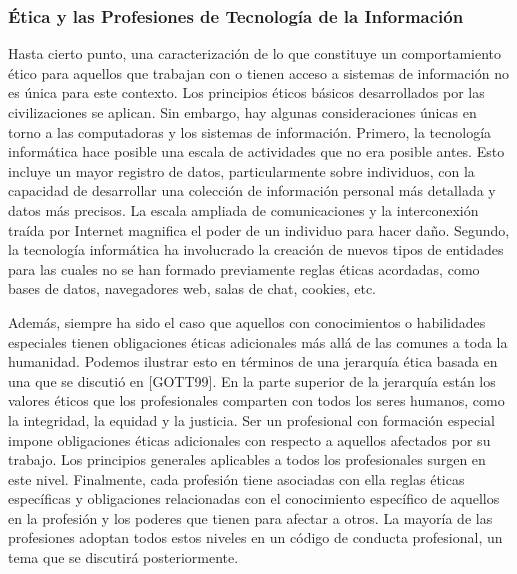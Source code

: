 \subsubsection{Ética y las Profesiones de Tecnología de la Información}
Hasta cierto punto, una caracterización de lo que constituye un comportamiento ético para aquellos que trabajan con o tienen acceso a sistemas de información no es única para este contexto. Los principios éticos básicos desarrollados por las civilizaciones se aplican. Sin embargo, hay algunas consideraciones únicas en torno a las computadoras y los sistemas de información. Primero, la tecnología informática hace posible una escala de actividades que no era posible antes. Esto incluye un mayor registro de datos, particularmente sobre individuos, con la capacidad de desarrollar una colección de información personal más detallada y datos más precisos. La escala ampliada de comunicaciones y la interconexión traída por Internet magnifica el poder de un individuo para hacer daño. Segundo, la tecnología informática ha involucrado la creación de nuevos tipos de entidades para las cuales no se han formado previamente reglas éticas acordadas, como bases de datos, navegadores web, salas de chat, cookies, etc.

Además, siempre ha sido el caso que aquellos con conocimientos o habilidades especiales tienen obligaciones éticas adicionales más allá de las comunes a toda la humanidad. Podemos ilustrar esto en términos de una jerarquía ética basada en una que se discutió en [GOTT99]. En la parte superior de la jerarquía están los valores éticos que los profesionales comparten con todos los seres humanos, como la integridad, la equidad y la justicia. Ser un profesional con formación especial impone obligaciones éticas adicionales con respecto a aquellos afectados por su trabajo. Los principios generales aplicables a todos los profesionales surgen en este nivel. Finalmente, cada profesión tiene asociadas con ella reglas éticas específicas y obligaciones relacionadas con el conocimiento específico de aquellos en la profesión y los poderes que tienen para afectar a otros. La mayoría de las profesiones adoptan todos estos niveles en un código de conducta profesional, un tema que se discutirá posteriormente.

